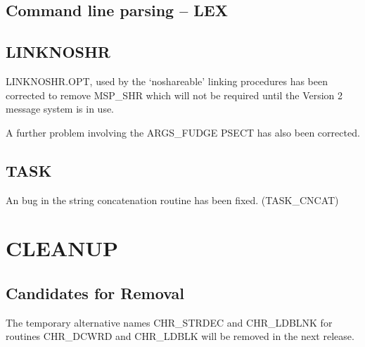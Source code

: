 \subsection{Command line parsing -- LEX}

\subsection{LINKNOSHR}
LINKNOSHR.OPT, used by the `noshareable' linking procedures has been
corrected to remove MSP\_SHR which will not be required until the Version 2
message system is in use.

A further problem involving the ARGS\_FUDGE PSECT has also been corrected.

\subsection{TASK}
An bug in the string concatenation routine has been fixed.
(TASK\_CNCAT)

\section{CLEANUP}
\subsection{Candidates for Removal}
The temporary alternative names CHR\_STRDEC and CHR\_LDBLNK for routines
CHR\_DCWRD and CHR\_LDBLK will be removed in the next release.


